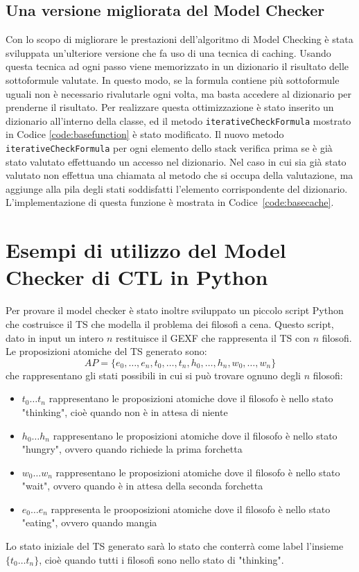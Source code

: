 \documentclass[a4paper, 10pt]{article}
\numberwithin{equation}{theor}
\begin{document}
\subsection{Una versione migliorata del Model Checker}
Con lo scopo di migliorare le prestazioni dell'algoritmo di Model Checking è stata sviluppata un'ulteriore versione che fa uso di una tecnica di caching. Usando questa tecnica ad ogni passo viene memorizzato in un dizionario il risultato delle sottoformule valutate. In questo modo, se la formula contiene più sottoformule uguali non è necessario rivalutarle ogni volta, ma basta accedere al dizionario per prenderne il risultato.
Per realizzare questa ottimizzazione è stato inserito un dizionario all'interno della classe, ed il metodo \texttt{iterativeCheckFormula} mostrato in Codice \ref{code:basefunction} è stato modificato. Il nuovo metodo \texttt{iterativeCheckFormula} per ogni elemento dello stack verifica prima se è già stato valutato effettuando un accesso nel dizionario. Nel caso in cui sia già stato valutato non effettua una chiamata al metodo che si occupa della valutazione, ma aggiunge alla pila degli stati soddisfatti l'elemento corrispondente del dizionario. L'implementazione di questa funzione è mostrata in Codice~\ref{code:basecache}.

\section{Esempi di utilizzo del Model Checker di \ac{CTL} in Python}
Per provare il model checker è stato inoltre sviluppato un piccolo script Python che costruisce il \ac{TS} che modella il problema dei filosofi a cena. Questo script, dato in input un intero $n$ restituisce il \ac{GEXF} che rappresenta il \ac{TS} con $n$ filosofi.
Le proposizioni atomiche del \ac{TS} generato sono:
$$AP = \{e_0, \dots, e_n, t_0, \dots, t_n, h_0, \dots, h_n, w_0, \dots, w_n \}$$
che rappresentano gli stati possibili in cui si può trovare ognuno degli $n$ filosofi:
\begin{itemize}
  \item{$t_0 \dots t_n$ rappresentano le proposizioni atomiche dove il filosofo è nello stato "thinking", cioè quando non è in attesa di niente}
  \item{$h_0 \dots h_n$ rappresentano le proposizioni atomiche dove il filosofo è nello stato "hungry", ovvero quando richiede la prima forchetta}
  \item{$w_0 \dots w_n$ rappresentano le proposizioni atomiche dove il filosofo è nello stato "wait", ovvero quando è in attesa della seconda forchetta}
  \item{$e_0 \dots e_n$ rappresenta le prooposizioni atomiche dove il filosofo è nello stato "eating", ovvero quando mangia}
\end{itemize}
Lo stato iniziale del \ac{TS} generato sarà lo stato che conterrà come label l'insieme $\{t_0 \dots t_n\}$, cioè quando tutti i filosofi sono nello stato di "thinking".
\end{document}

